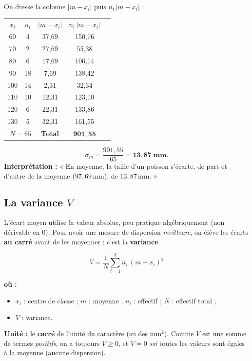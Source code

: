 \documentclass[11pt,a4paper]{article}
\newenvironment{ou}{%
  \par\smallskip\noindent\textbf{où :}\nopagebreak
  \begin{itemize}[leftmargin=1.8em,topsep=2pt,itemsep=1.5pt,parsep=0pt]}%
  {\end{itemize}}
\newcommand{\ecm}{\sigma_m}              %
\begin{document}
\begin{exemple}[calcul de l'écart moyen — poissons, $m=97{,}69$]
On dresse la colonne $|m-x_i|$ puis $n_i\,|m-x_i|$ :
\begin{center}
\renewcommand{\arraystretch}{1.15}
\begin{tabular}{c c c c c}
\rowcolor{primary!18}
$x_i$ & $n_i$ & $|m-x_i|$ & $n_i\,|m-x_i|$ \\
60  & 4  & 37{,}69 & 150{,}76 \\
70  & 2  & 27{,}69 & 55{,}38 \\
80  & 6  & 17{,}69 & 106{,}14 \\
90  & 18 & 7{,}69  & 138{,}42 \\
100 & 14 & 2{,}31  & 32{,}34 \\
110 & 10 & 12{,}31 & 123{,}10 \\
120 & 6  & 22{,}31 & 133{,}86 \\
130 & 5  & 32{,}31 & 161{,}55 \\
\hline
\multicolumn{2}{r}{$N=65$} & \textbf{Total} & $\mathbf{901{,}55}$ \\
\end{tabular}
\end{center}
\[
\ecm=\dfrac{901{,}55}{65}=\mathbf{13{,}87\;\text{mm}}.
\]
\textbf{Interprétation :} « En moyenne, la taille d'un poisson s'écarte, de part et d'autre de la
moyenne ($97{,}69$\,mm), de $13{,}87$\,mm. »
\end{exemple}

\subsection{La variance $V$}

L'écart moyen utilise la valeur absolue, peu pratique algébriquement (non dérivable en $0$). Pour
avoir une mesure de dispersion \emph{meilleure}, on élève les écarts \textbf{au carré} avant de les
moyenner : c'est la \textbf{variance}.

\begin{formule}
\[
\boxed{\;V=\dfrac{1}{N}\sum_{i=1}^{k} n_i\,(m-x_i)^2\;}
\]
\begin{ou}
  \item $x_i$ : centre de classe ; $m$ : moyenne ; $n_i$ : effectif ; $N$ : effectif total ;
  \item $V$ : variance.
\end{ou}
\textbf{Unité :} le \textbf{carré} de l'unité du caractère (ici des $\text{mm}^2$). Comme $V$ est
une somme de termes \emph{positifs}, on a toujours $V\geqslant 0$, et $V=0$ \emph{ssi} toutes les
valeurs sont égales à la moyenne (aucune dispersion).
\end{formule}
\end{document}
